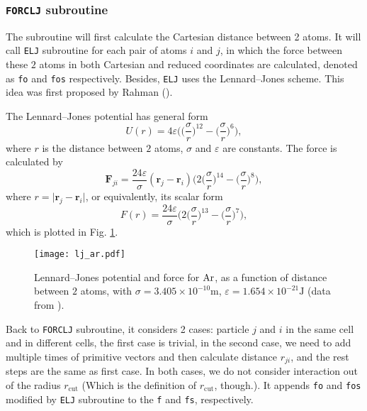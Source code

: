 
\subsubsection{\texttt{FORCLJ} subroutine}
\label{sssec:forclj}

The subroutine will first calculate the Cartesian distance between 2 atoms.
It will call \texttt{ELJ} subroutine for each pair of atoms $i$ and $j$, in which
the force between these $2$ atoms in both Cartesian and reduced coordinates
are calculated, denoted as \texttt{fo} and \texttt{fos} respectively.
Besides, \texttt{ELJ} uses the Lennard--Jones scheme. This idea was first proposed by
Rahman (\cite{rahman1964correlations}).

The Lennard--Jones potential has general form
\begin{equation}
	U(r) = 4\varepsilon \bigg( \Big( \frac{ \sigma }{ r } \Big) ^ {12} -
	\Big( \frac{ \sigma }{ r } \Big) ^ 6 \bigg),
\end{equation}
where $r$ is the distance between $2$ atoms, $\sigma$ and $\varepsilon$
are constants.
The force is calculated by
\begin{equation}
	\bm{F}_{ji} = \frac{ 24\varepsilon }{ \sigma } (\bm{r}_j - \bm{r}_i)
	\bigg( 2\Big( \frac{ \sigma }{ r } \Big) ^ {14} -
	\Big( \frac{ \sigma }{ r } \Big) ^ 8 \bigg),
\end{equation}
where $r = \lvert \bm{r}_j - \bm{r}_i \rvert$, or equivalently, its scalar form
\begin{equation}
	F(r) = \frac{ 24\varepsilon }{ \sigma }
	\bigg( 2\Big( \frac{ \sigma }{ r } \Big) ^ {13} -
	\Big( \frac{ \sigma }{ r } \Big) ^ 7 \bigg),
\end{equation}
which is plotted in Fig. \ref{fig:ljar}.

\begin{figure}[h]
	\centering
	\texttt{[image: lj\_ar.pdf]}
	\caption{Lennard--Jones potential and force for $\ce{Ar}$, as a function of
		distance between $2$ atoms, with
		$\sigma=3.405\times 10^{-10}\si{\meter}$,
		$\varepsilon = 1.654\times 10^{-21}\si{\joule}$ (data from \cite{buffalomd}).}
	\label{fig:ljar}
\end{figure}

Back to \texttt{FORCLJ} subroutine,
it considers 2 cases: particle $j$ and $i$ in the same cell and
in different cells, the first case is trivial, in the second case,
we need to add multiple times of primitive vectors and then calculate distance
$r_{ji}$, and the rest steps are the same as first case. In both cases, we do not
consider interaction out of the radius $r_{\text{cut}}$ (Which is the definition of
$r_\text{cut}$, though.).
It appends \texttt{fo} and \texttt{fos} modified by \texttt{ELJ}
subroutine to the \texttt{f} and \texttt{fs}, respectively.
